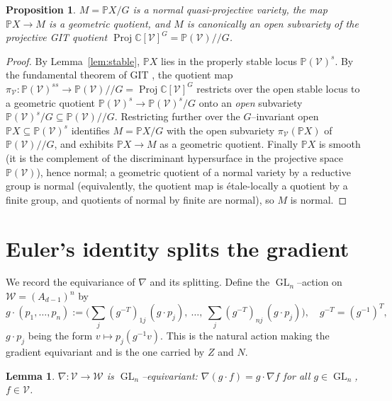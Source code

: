 \documentclass{amsart}
\newtheorem{lemma}{Lemma}
\newtheorem{proposition}{Proposition}
\theoremstyle{definition}
\DeclareMathOperator{\GL}{GL}
\DeclareMathOperator{\Proj}{Proj}
\newcommand{\PP}{\mathbb{P}}
\newcommand{\CC}{\mathbb{C}}
\newcommand{\nab}{\nabla}
\begin{document}
\begin{proposition}\label{prop:sourcenormal}
$M=\PP X/G$ is a normal quasi-projective variety, the map $\PP X\to M$ is a geometric
quotient, and $M$ is canonically an open subvariety of the projective GIT quotient
$\Proj\CC[\mathcal V]^{G}=\PP(\mathcal V)/\!/G$.
\end{proposition}

\begin{proof}
By Lemma~\ref{lem:stable}, $\PP X$ lies in the properly stable locus $\PP(\mathcal V)^{s}$.
By the fundamental theorem of GIT \cite[Ch.~1, Thm.~1.10 and Converse~1.13]{MFK}, the
quotient map $\pi_{\mathcal V}\colon \PP(\mathcal V)^{ss}\to \PP(\mathcal V)/\!/G=
\Proj\CC[\mathcal V]^{G}$ restricts over the open stable locus to a geometric quotient
$\PP(\mathcal V)^{s}\to \PP(\mathcal V)^{s}/G$ onto an \emph{open} subvariety
$\PP(\mathcal V)^{s}/G\subseteq\PP(\mathcal V)/\!/G$. Restricting further over the
$G$--invariant open $\PP X\subseteq\PP(\mathcal V)^{s}$ identifies $M=\PP X/G$ with the open
subvariety $\pi_{\mathcal V}(\PP X)$ of $\PP(\mathcal V)/\!/G$, and exhibits $\PP X\to M$ as a
geometric quotient. Finally $\PP X$ is smooth (it is the complement of the discriminant
hypersurface in the projective space $\PP(\mathcal V)$), hence normal; a geometric quotient of
a normal variety by a reductive group is normal \cite[Ch.~1, \S 2, Remark~6 and Amp.~1.3]{MFK}
(equivalently, the quotient map is étale-locally a quotient by a finite group, and quotients
of normal by finite are normal), so $M$ is normal.
\end{proof}

\section{Euler's identity splits the gradient}\label{sec:euler}

We record the equivariance of $\nab$ and its splitting. Define the $\GL_n$--action on
$\mathcal W=(A_{d-1})^n$ by
\begin{equation}\label{eq:Zaction}
g\cdot (p_1,\dots,p_n)
:= \Big(\textstyle\sum_{j}(g^{-T})_{1j}\,(g\cdot p_j),\ \dots,\ \sum_{j}(g^{-T})_{nj}\,(g\cdot p_j)\Big),
\quad g^{-T}=(g^{-1})^{T},
\end{equation}
$g\cdot p_j$ being the form $v\mapsto p_j(g^{-1}v)$. This is the natural action making the
gradient equivariant and is the one carried by $Z$ and $N$.

\begin{lemma}\label{lem:nabeq}
$\nab\colon \mathcal V\to\mathcal W$ is $\GL_n$--equivariant: $\nab(g\cdot f)=g\cdot\nab f$
for all $g\in\GL_n$, $f\in\mathcal V$.
\end{lemma}
\end{document}
